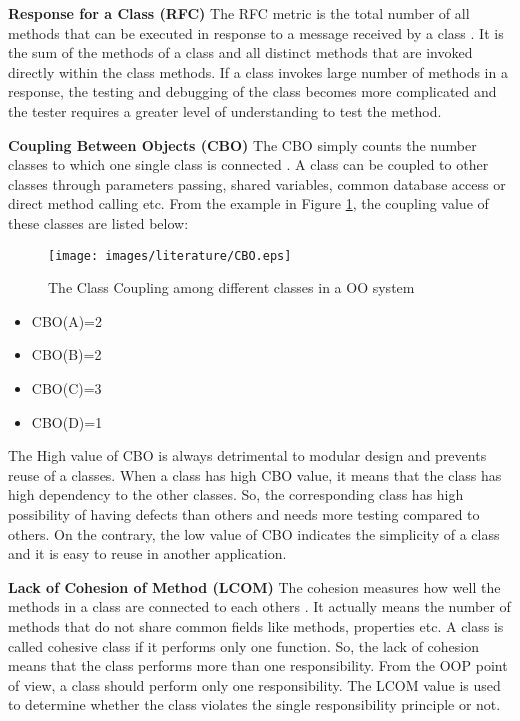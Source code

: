 \documentclass[12pt]{report}
\begin{document}
\textbf{Response for a Class (RFC)} 
The RFC metric is the total number of all methods that can be executed in response to a message received by a class \cite{chidamber1994metrics}. It is the sum of the methods of a class and all distinct methods that are invoked directly within the class methods. If a class invokes large number of methods in a response, the testing and debugging of the class becomes more complicated and  the tester requires a greater level of understanding to test the method. 



\textbf{Coupling Between Objects (CBO)}
The CBO simply counts the number classes to which one single class is connected \cite{chidamber1994metrics}. A class can be coupled to other classes through parameters passing, shared variables, common database access or direct method calling etc. From the example in Figure \ref{CBO_codeMetrics}, the coupling value of these classes are listed below: 
\begin{figure}[h!]
  \centering
    \texttt{[image: images/literature/CBO.eps]}
		\caption{The Class Coupling among different classes in a OO system}
		\label{CBO_codeMetrics}
\end{figure}

\begin{itemize}
	\item CBO(A)=2
	\item CBO(B)=2
	\item CBO(C)=3
	\item CBO(D)=1
\end{itemize}

The High value of CBO is always detrimental to modular design and prevents reuse of a classes. When a class has high CBO value, it means that the class has high dependency to the other classes. So, the corresponding class has high possibility of having defects than others and needs more testing compared to others. On the contrary, the low value of CBO indicates the simplicity of a class and it is easy to reuse in another application. 


\textbf{Lack of Cohesion of Method (LCOM)} 
The cohesion measures how well the methods in a class are connected to each others \cite{chidamber1994metrics}. It actually means the number of methods that do not share common fields like methods, properties etc. A class is called cohesive class if it performs only one function. So, the lack of cohesion means that the class performs more than one responsibility. From the OOP point of view, a class should perform only one responsibility. The LCOM value is used to determine whether the class violates the single responsibility principle or not. 
\end{document}
